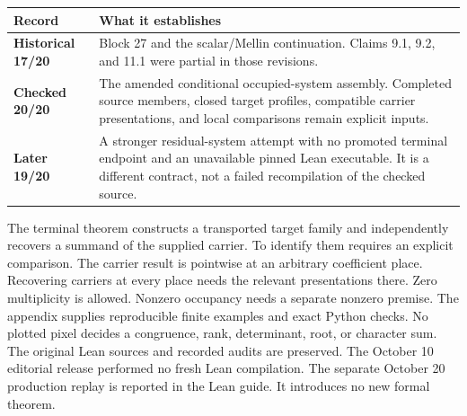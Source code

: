 \begin{tabularx}{\linewidth}{@{}p{.22\linewidth}Y@{}}\toprule
Record & What it establishes\\\midrule
\textbf{Historical 17/20} & Block 27 and the scalar/Mellin continuation. Claims 9.1, 9.2, and 11.1 were partial in those revisions.\\
\textbf{Checked 20/20} & The amended conditional occupied-system assembly. Completed source members, closed target profiles, compatible carrier presentations, and local comparisons remain explicit inputs.\\
\textbf{Later 19/20} & A stronger residual-system attempt with no promoted terminal endpoint and an unavailable pinned Lean executable. It is a different contract, not a failed recompilation of the checked source.\\\bottomrule
\end{tabularx}
The terminal theorem constructs a transported target family and independently
recovers a summand of the supplied carrier. To identify them requires an explicit
comparison. The carrier result is pointwise at an arbitrary coefficient place.
Recovering carriers at every place needs the relevant presentations there.
Zero multiplicity is allowed. Nonzero occupancy needs a separate nonzero premise.
The appendix supplies reproducible finite examples and exact Python checks.
No plotted pixel decides a congruence, rank, determinant, root, or character sum.
The original Lean sources and recorded audits are preserved. The October 10 editorial
release performed no fresh Lean compilation. The separate October 20 production
replay is reported in the Lean guide. It introduces no new formal theorem.

